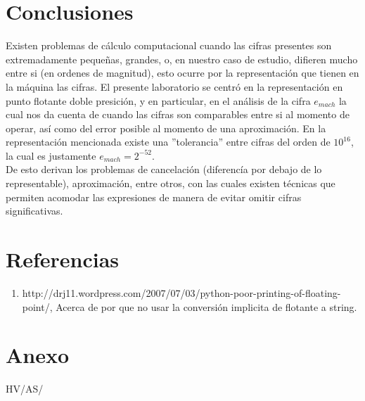 \documentclass[spanish, fleqn]{article}
\begin{document}
\section{Conclusiones}
	Existen problemas de cálculo computacional cuando las cifras presentes son 
	extremadamente pequeñas, grandes, o, en nuestro caso de estudio, difieren
	mucho entre si (en ordenes de magnitud), esto ocurre por la representación
	que tienen en la máquina las cifras. El presente laboratorio se centró en
	la representación en punto flotante doble presición, y en particular, en el
	análisis de la cifra $e_{mach}$ la cual nos da cuenta de cuando las cifras
	son comparables entre si al momento de operar, así como del error posible
	al momento de una aproximación. En la representación mencionada existe una
	''tolerancia'' entre cifras del orden de $10^{16}$, la cual es justamente
	$e_{mach} = 2^{-52}$.\\
	De esto derivan los problemas de cancelación (diferencía por debajo de lo
	representable), aproximación, entre otros, con las cuales existen técnicas
	que permiten acomodar las expresiones de manera de evitar omitir cifras
	significativas.

\section{Referencias}
\begin{enumerate}
	\item
		 http://drj11.wordpress.com/2007/07/03/python-poor-printing-of-floating-point/,
		 Acerca de por que no usar la conversión implicita de flotante a string.
\end{enumerate}

\newpage
\section{Anexo}
	
	\newpage
	

\vfill\hfill HV/AS/\LaTeXe
\end{document}

